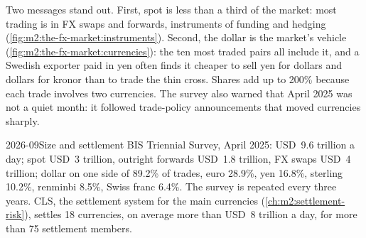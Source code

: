 Two messages stand out. First, spot is less than a third of the market: most
trading is in FX swaps and forwards, instruments of funding and hedging
(\cref{fig:m2:the-fx-market:instruments}). Second, the dollar is the
market's vehicle (\cref{fig:m2:the-fx-market:currencies}): the ten most
traded pairs all include it, and a Swedish exporter paid in yen often finds it
cheaper to sell yen for dollars and dollars for kronor than to trade the thin
cross.
Shares add up to 200\% because each trade involves two currencies. The survey
also warned that April 2025 was not a quiet month: it followed trade-policy
announcements that moved currencies sharply.

\begin{omfigure}

\label{fig:m2:the-fx-market:currencies}
\end{omfigure}

\begin{dated}{2026-09}{Size and settlement}\label{dat:m2:the-fx-market:survey}
BIS Triennial Survey, April 2025: USD~9.6 trillion a day; spot USD~3 trillion,
outright forwards USD~1.8 trillion, FX swaps USD~4 trillion; dollar on one side
of 89.2\% of trades, euro 28.9\%, yen 16.8\%, sterling 10.2\%, renminbi 8.5\%,
Swiss franc 6.4\%. The survey is repeated every three years. CLS, the settlement
system for the main currencies (\cref{ch:m2:settlement-risk}), settles 18
currencies, on average more than USD~8 trillion a day, for more than 75
settlement members.
\end{dated}

